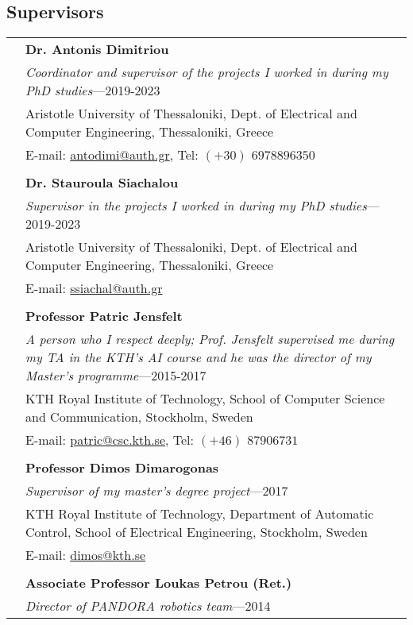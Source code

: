\documentclass[a4paper,10pt,twoside]{article}
\begin{document}
\subsection*{Supervisors}
\vspace{0.5cm}
\begin{tabular}{rp{14cm}}
& \textbf{Dr. Antonis Dimitriou} \\
& \textit{Coordinator and supervisor of the projects I worked in during my PhD studies}---2019-2023\\
&Aristotle University of Thessaloniki, Dept. of Electrical and Computer Engineering, Thessaloniki, Greece \\
& E-mail: \href{mailto: antodimi@auth.gr}{antodimi@auth.gr}, Tel: $(+30)$ $697 889 6350$ \\
&\\
& \textbf{Dr. Stauroula Siachalou} \\
& \textit{Supervisor in the projects I worked in during my PhD studies}---2019-2023\\
&Aristotle University of Thessaloniki, Dept. of Electrical and Computer Engineering, Thessaloniki, Greece \\
& E-mail: \href{mailto: ssiachal@auth.gr}{ssiachal@auth.gr} \\
&\\
& \textbf{Professor Patric Jensfelt}\\
& \textit{A person who I respect deeply; Prof. Jensfelt supervised me during my TA in the KTH's AI course and he was the director of my Master's programme}---2015-2017\\
&KTH Royal Institute of Technology, School of Computer Science and Communication, Stockholm, Sweden \\
& E-mail: \href{mailto: patric@csc.kth.se}{patric@csc.kth.se}, Tel: $(+46)$ $8 790 67 31$ \\
&\\
& \textbf{Professor Dimos Dimarogonas}\\
& \textit{Supervisor of my master's degree project}---2017\\
&KTH Royal Institute of Technology, Department of Automatic Control, School of Electrical Engineering, Stockholm, Sweden \\
& E-mail: \href{mailto: dimos@kth.se}{dimos@kth.se} \\
&\\
& \textbf{Associate Professor Loukas Petrou (Ret.)}\\
& \textit{Director of PANDORA robotics team}---2014\\

\end{tabular}
\end{document}
